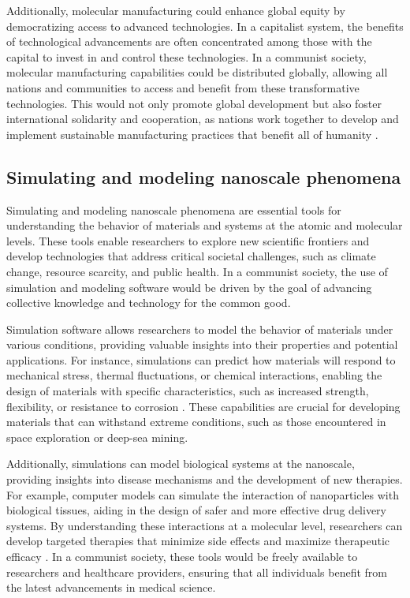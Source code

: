 Additionally, molecular manufacturing could enhance global equity by democratizing access to advanced technologies. In a capitalist system, the benefits of technological advancements are often concentrated among those with the capital to invest in and control these technologies. In a communist society, molecular manufacturing capabilities could be distributed globally, allowing all nations and communities to access and benefit from these transformative technologies. This would not only promote global development but also foster international solidarity and cooperation, as nations work together to develop and implement sustainable manufacturing practices that benefit all of humanity \cite[pp.~150-160]{freitas1999nanomedicine}.

\subsection{Simulating and modeling nanoscale phenomena}

Simulating and modeling nanoscale phenomena are essential tools for understanding the behavior of materials and systems at the atomic and molecular levels. These tools enable researchers to explore new scientific frontiers and develop technologies that address critical societal challenges, such as climate change, resource scarcity, and public health. In a communist society, the use of simulation and modeling software would be driven by the goal of advancing collective knowledge and technology for the common good.

Simulation software allows researchers to model the behavior of materials under various conditions, providing valuable insights into their properties and potential applications. For instance, simulations can predict how materials will respond to mechanical stress, thermal fluctuations, or chemical interactions, enabling the design of materials with specific characteristics, such as increased strength, flexibility, or resistance to corrosion \cite[pp.~65-73]{meyer2004nanotechnology}. These capabilities are crucial for developing materials that can withstand extreme conditions, such as those encountered in space exploration or deep-sea mining.

Additionally, simulations can model biological systems at the nanoscale, providing insights into disease mechanisms and the development of new therapies. For example, computer models can simulate the interaction of nanoparticles with biological tissues, aiding in the design of safer and more effective drug delivery systems. By understanding these interactions at a molecular level, researchers can develop targeted therapies that minimize side effects and maximize therapeutic efficacy \cite[pp.~180-188]{ratner2003nanotechnology}. In a communist society, these tools would be freely available to researchers and healthcare providers, ensuring that all individuals benefit from the latest advancements in medical science.

